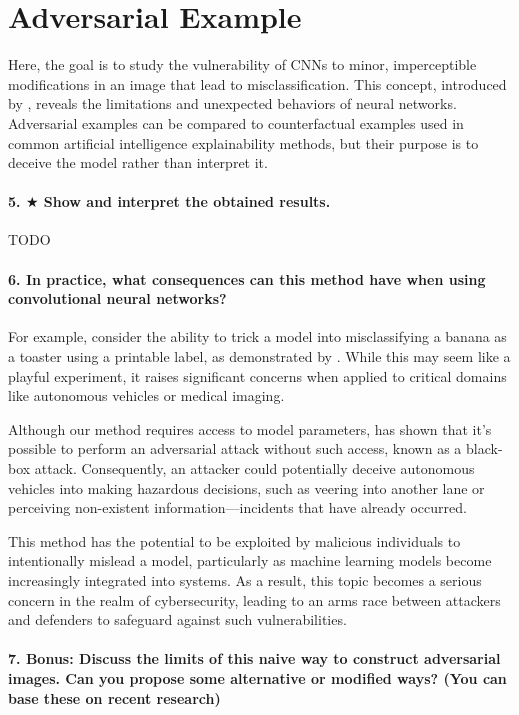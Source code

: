 \section{Adversarial Example}

Here, the goal is to study the vulnerability of CNNs to minor, imperceptible modifications in an image that lead to misclassification. This concept, introduced by \cite{szegedy2014intriguing}, reveals the limitations and unexpected behaviors of neural networks. Adversarial examples can be compared to counterfactual examples used in common artificial intelligence explainability methods, but their purpose is to deceive the model rather than interpret it.

\paragraph*{5. $ \bigstar $ Show and interpret the obtained results.}

TODO

\paragraph*{6. In practice, what consequences can this method have when using convolutional neural networks?}

For example, consider the ability to trick a model into misclassifying a banana as a toaster using a printable label, as demonstrated by \cite{brown2018adversarial}. While this may seem like a playful experiment, it raises significant concerns when applied to critical domains like autonomous vehicles or medical imaging. 

Although our method requires access to model parameters, \cite{athalye2018synthesizing} has shown that it's possible to perform an adversarial attack without such access, known as a black-box attack. Consequently, an attacker could potentially deceive autonomous vehicles into making hazardous decisions, such as veering into another lane or perceiving non-existent information—incidents that have already occurred. 

This method has the potential to be exploited by malicious individuals to intentionally mislead a model, particularly as machine learning models become increasingly integrated into systems. As a result, this topic becomes a serious concern in the realm of cybersecurity, leading to an arms race between attackers and defenders to safeguard against such vulnerabilities.

\paragraph*{7. \textbf{Bonus:} Discuss the limits of this naive way to construct adversarial images. Can you propose some alternative or modiﬁed ways? (You can base these on recent research)}

